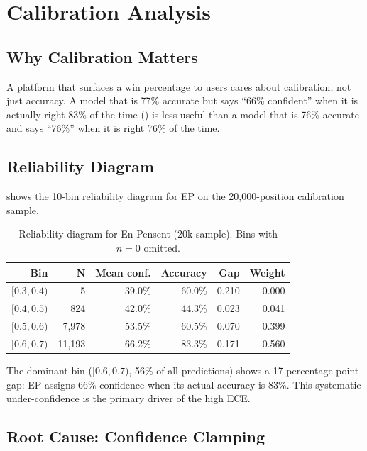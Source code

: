 \documentclass[11pt,a4paper]{article}
\begin{document}
\section{Calibration Analysis}
\label{sec:calibration}

\subsection{Why Calibration Matters}

A platform that surfaces a win percentage to users cares about calibration,
not just accuracy. A model that is 77\% accurate but says ``66\%
confident'' when it is actually right 83\% of the time
() is less useful than a model that is 76\% accurate
and says ``76\%'' when it is right 76\% of the time.

\subsection{Reliability Diagram}

 shows the 10-bin reliability diagram for EP on the
20{,}000-position calibration sample.

\begin{table}[h]
\centering
\caption{Reliability diagram for En Pensent (20k sample). Bins with $n=0$
omitted.}
\label{tab:reliability}
\begin{tabular}{rrrrrr}
\toprule
\textbf{Bin} & \textbf{N} & \textbf{Mean conf.} & \textbf{Accuracy} & \textbf{Gap} & \textbf{Weight} \\
\midrule
$[0.3, 0.4)$ &       5 & 39.0\% & 60.0\% & 0.210 & 0.000 \\
$[0.4, 0.5)$ &     824 & 42.0\% & 44.3\% & 0.023 & 0.041 \\
$[0.5, 0.6)$ &   7{,}978 & 53.5\% & 60.5\% & 0.070 & 0.399 \\
$[0.6, 0.7)$ &  11{,}193 & 66.2\% & 83.3\% & 0.171 & 0.560 \\
\bottomrule
\end{tabular}
\end{table}

The dominant bin ($[0.6, 0.7)$, 56\% of all predictions) shows a 17
percentage-point gap: EP assigns 66\% confidence when its actual accuracy
is 83\%. This systematic under-confidence is the primary driver of the high
ECE.

\subsection{Root Cause: Confidence Clamping}
\label{sec:clamping}
\end{document}
